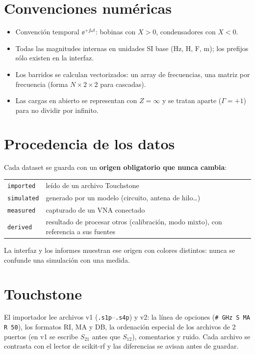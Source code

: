 \section{Convenciones numéricas}
\begin{itemize}
\item Convención temporal $\ee^{+\jj\omega t}$: bobinas con $X>0$, condensadores con $X<0$.
\item Todas las magnitudes internas en unidades SI base (\si{\hertz}, \si{\henry}, \si{\farad}, \si{\metre}); los prefijos sólo existen en la interfaz.
\item Los barridos se calculan vectorizados: un array de frecuencias, una matriz por frecuencia (forma $N\times2\times2$ para cascadas).
\item Las cargas en abierto se representan con $Z = \infty$ y se tratan aparte ($\Gamma = +1$) para no dividir por infinito.
\end{itemize}

\section{Procedencia de los datos}
Cada dataset se guarda con un \textbf{origen obligatorio que nunca cambia}:
\begin{center}
\begin{tabular}{ll}\toprule
\texttt{imported} & leído de un archivo Touchstone\\
\texttt{simulated} & generado por un modelo (circuito, antena de hilo\ldots)\\
\texttt{measured} & capturado de un VNA conectado\\
\texttt{derived} & resultado de procesar otros (calibración, modo mixto), con referencia a sus fuentes\\ \bottomrule
\end{tabular}
\end{center}
La interfaz y los informes muestran ese origen con colores distintos: nunca se confunde una simulación con una medida.

\section{Touchstone}
El importador lee archivos v1 (\texttt{.s1p}--\texttt{.s4p}) y v2: la línea de opciones (\texttt{\# GHz S MA R 50}), los formatos RI, MA y DB,
la ordenación especial de los archivos de 2 puertos (en v1 se escribe $S_{21}$ antes que $S_{12}$), comentarios y ruido. Cada archivo
se contrasta con el lector de scikit-rf y las diferencias se avisan antes de guardar.

